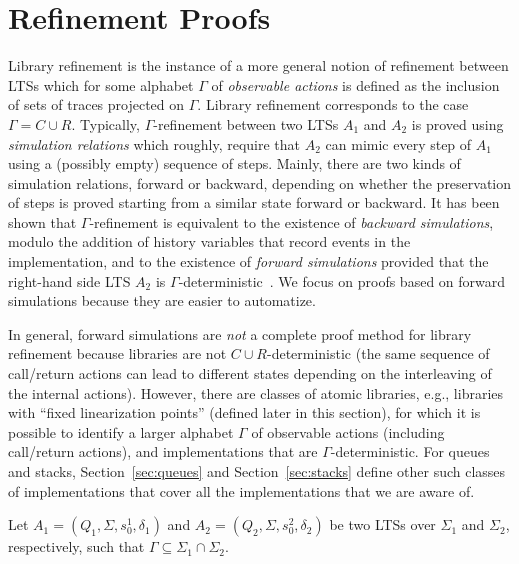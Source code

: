 \vspace{-3.5mm}
\section{Refinement Proofs}
\vspace{-1.5mm}
Library refinement is the instance of a more general notion of refinement between LTSs
which for some alphabet $\Gamma$ of \emph{observable actions} is defined as the inclusion of sets of 
traces projected on $\Gamma$. Library refinement corresponds to the case $\Gamma=C\cup R$. 
Typically, $\Gamma$-refinement between two LTSs $A_1$ and $A_2$ is proved using \emph{simulation relations} which roughly, require that 
$A_2$ can mimic every step of $A_1$ using a (possibly empty) sequence of steps. Mainly, there are two kinds of simulation
relations, forward or backward, depending on whether the preservation of steps is proved starting from a similar state
forward or backward. It has been shown
that $\Gamma$-refinement is equivalent to the existence of \emph{backward simulations}, modulo the addition of history variables
that record events in the implementation, and to the existence of \emph{forward simulations} provided that the right-hand side
LTS $A_2$ is $\Gamma$-deterministic~\cite{DBLP:journals/tcs/AbadiL91,DBLP:journals/iandc/LynchV95}. 
We focus on proofs based on forward simulations because they are easier to automatize.


In general, forward simulations are \emph{not} a complete proof method for library refinement because libraries are not 
$C\cup R$-deterministic (the same sequence of call/return actions can lead to different states depending on the interleaving of the internal actions).
However, there are classes of atomic libraries, e.g., libraries with ``fixed linearization points'' (defined later in this section), 
for which it is possible to identify a larger alphabet $\Gamma$ of observable actions (including call/return actions), 
and implementations that are $\Gamma$-deterministic. For queues and stacks, 
Section~\ref{sec:queues} and Section~\ref{sec:stacks} define other such classes of implementations that cover
all the implementations that we are aware of.

Let $A_1=(Q_1,\Sigma, s_0^1, \delta_1)$ and $A_2=(Q_2,\Sigma, s_0^2, \delta_2)$ be two LTSs over $\Sigma_1$ and $\Sigma_2$, respectively, such that $\Gamma\subseteq \Sigma_1\cap\Sigma_2$. 

